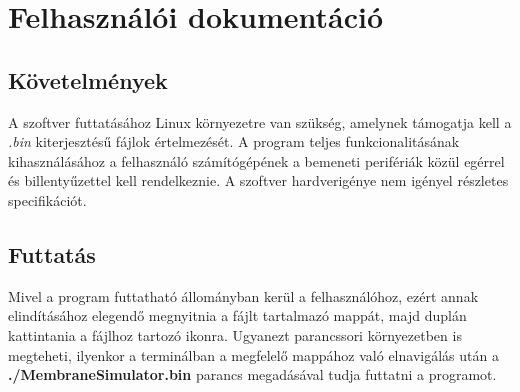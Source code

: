 \chapter{Felhasználói dokumentáció}
\label{ch:user}

\section{Követelmények}

A szoftver futtatásához Linux környezetre van szükség, amelynek támogatja kell a \textit{.bin} kiterjesztésű fájlok értelmezését. A program teljes funkcionalitásának kihasználásához a felhasználó számítógépének a bemeneti perifériák közül egérrel és billentyűzettel kell rendelkeznie. A szoftver hardverigénye nem igényel részletes specifikációt.


\section{Futtatás}

Mivel a program futtatható állományban kerül a felhasználóhoz, ezért annak elindításához elegendő megnyitnia a fájlt tartalmazó mappát, majd duplán kattintania a fájlhoz tartozó ikonra. Ugyanezt parancssori környezetben is megteheti, ilyenkor a terminálban a megfelelő mappához való elnavigálás után a \textbf{./MembraneSimulator.bin} parancs megadásával tudja futtatni a programot.
